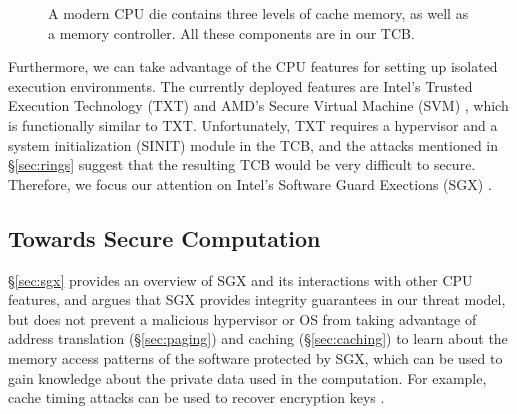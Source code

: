 \begin{figure}[hbtp]
  \caption{
    A modern CPU die contains three levels of cache memory, as well as a
    memory controller. All these components are in our TCB.
  }
  \label{fig:cpu_die}
\end{figure}

Furthermore, we can take advantage of the CPU features for setting up isolated
execution environments. The currently deployed features are Intel's Trusted
Execution Technology (TXT) \cite{grawrock2009txt} and AMD's Secure Virtual
Machine (SVM) \cite{strongin2005trusted}, which is functionally similar to TXT.
Unfortunately, TXT requires a hypervisor and a system initialization (SINIT)
module in the TCB, and the attacks mentioned in \S \ref{sec:rings} suggest that
the resulting TCB would be very difficult to secure. Therefore, we focus our
attention on Intel's Software Guard Exections (SGX) \cite{mckeen2013innovative}
\cite{anati2013sgx}.


\subsection{Towards Secure Computation}
\label{sec:approach}

\S \ref{sec:sgx} provides an overview of SGX and its interactions with other
CPU features, and argues that SGX provides integrity guarantees in our threat
model, but does not prevent a malicious hypervisor or OS from taking advantage
of address translation (\S \ref{sec:paging}) and caching (\S \ref{sec:caching})
to learn about the memory access patterns of the software protected by SGX,
which can be used to gain knowledge about the private data used in the
computation. For example, cache timing attacks can be used to recover
encryption keys \cite{bonneau2006cache} \cite{brumley2005remote}
\cite{kocher1996timing}.

